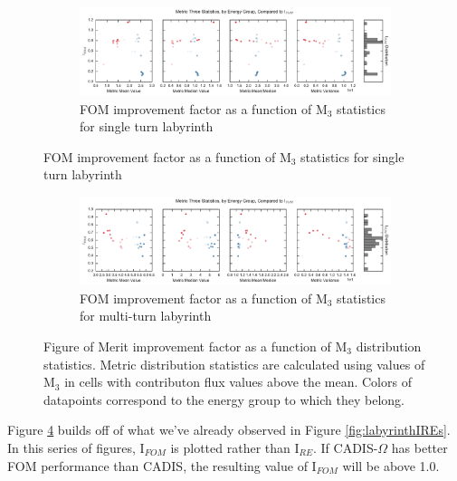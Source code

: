 \begin{figure}[htb!]
  \centering
  \begin{subfigure}[t]{\textwidth}
    \includegraphics[width=\linewidth]{./chapters/characterization_probs/figures/char/maze2/metric_three_fom_stats_mean.pdf}
    \caption{FOM improvement factor as a function of M$_{3}$ statistics for single turn labyrinth}
    \label{fig:maze2M3FOMs}
  \end{subfigure}
\end{figure}
\begin{figure}[htb!]\ContinuedFloat
  \centering
  \begin{subfigure}[t]{\textwidth}
    \includegraphics[width=\linewidth]{./chapters/characterization_probs/figures/char/maze1/metric_three_fom_stats_mean.pdf}
    \caption{FOM improvement factor as a function of M$_3$ statistics for multi-turn labyrinth}
    \label{fig:maze1M3FOMs}
  \end{subfigure}
  \caption[Figure of Merit improvement factor as a function of M$_3$
  distribution statistics.]
  {Figure of Merit improvement factor as a function of M$_3$
  distribution statistics. Metric distribution statistics are calculated using
  values of M$_3$ in cells with contributon flux values above the mean. Colors
  of datapoints correspond to the energy group to which they belong.}
  \label{fig:labyrinthIFOMs}
\end{figure}

Figure \ref{fig:labyrinthIFOMs} builds off of what we've already observed in Figure
\ref{fig:labyrinthIREs}. In this series of figures, I$_{FOM}$ is plotted rather
than I$_{RE}$. If CADIS-$\Omega$ has better FOM performance than CADIS, the
resulting value of I$_{FOM}$ will be above 1.0.


